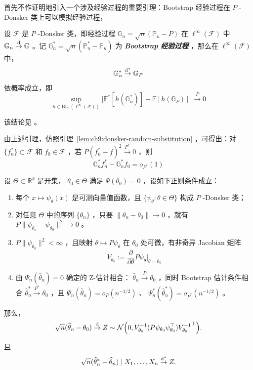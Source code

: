 首先不作证明地引入一个涉及经验过程的重要引理：Bootstrap 经验过程在 $P$ -Donsker 类上可以模拟经验过程，

\begin{lemma*}

设 $\mathscr F$ 是 $P$ -Donsker 类，即经验过程 $\mathbb G_n=\sqrt n(\mathbb P_n-P)$ 在 $\ell^\infty(\mathscr F)$ 中 $\mathbb G_n\overset{\rm d}\to \mathbb G$ 。记 $\mathbb G_n^*=\sqrt n(\mathbb P_n^*-\mathbb P_n)$ 为 \textbf{\emph{Bootstrap 经验过程}} ，那么在 $\ell^\infty(\mathscr F)$ 中， \[ \mathbb G_n^* \overset{\rm d^*}\to \mathbb G_P \]依概率成立，即
\[\sup_{h\in\mathrm{BL}_1(\ell^\infty(\mathscr F))}\Big|\mathbb E^*[h(\mathbb G_n^*)]-\mathbb E[h(\mathbb G_P)]\Big|\overset{P}\to 0\]
\end{lemma*}
该结论见 \cite{ginezinn1990}。

由上述引理，仿照引理~\ref{lem:ch9:donsker-random-substitution} ，可得出：对 $\{f^*_n\}\subset \mathscr F$ 和 $f_0\in \mathscr F$ ，若 $P(f^*_n-f)^2 \overset{P^*}\to 0$ ，则
\[\mathbb G_n^*f^*_n-\mathbb G_n^*f_0=o_{P^*}(1)\]

\begin{theorem}
\label{thm:ch11:bootstrap-z-estimator}

设 $\Theta\subset \mathbb R^k$ 是开集， $\theta_0\in\Theta$ 满足 $\Psi(\theta_0)=0$ ，设如下正则条件成立：

\begin{enumerate}
\def\labelenumi{\arabic{enumi}.}
\tightlist
\item
  每个 $x\mapsto \psi_\theta(x)$ 是可测向量值函数，且 $\{\psi_\theta:\theta\in\Theta\}$ 构成 $P$ -Donsker 类；
\item
  对任意 $\Theta$ 中的序列 $\{\theta_n\}$ ，只要 $\|\theta_n-\theta_0\|\to 0$ ，就有 $P\|\psi_{\theta_n}-\psi_{\theta_0}\|^2\to 0$ 。
\item
  $P\|\psi_{\theta_0}\|^2<\infty$ ，且映射 $\theta \mapsto P\psi_\theta$ 在 $\theta_0$ 处可微，有非奇异 Jacobian 矩阵\[ V_{\theta_0} := \frac{\partial}{\partial\theta} P\psi_\theta \Big|_{\theta=\theta_0} \]
\item
  由 $\Psi_n(\widehat\theta_n)=0$ 确定的 Z-估计相合： $\widehat\theta_n\overset{P}\to\theta_0$ ，同时 Bootstrap 估计条件相合 $\widehat\theta_n^* \overset{P^*}\to \theta_0$ ，且 $\Psi_n(\widehat\theta_n)=o_P(n^{-1/2})$ 、 $\Psi_n^*(\widehat \theta_n^*)=o_{P^*}(n^{-1/2})$ 。
\end{enumerate}

那么，
\[
\sqrt n(\widehat\theta_n-\theta_0)\overset{\rm d}\to Z\sim \mathcal N\Big(0,V_{\theta_0}^{-1}(P\psi_{\theta_0}\psi_{\theta_0}^\top){V_{\theta_0}^{-1}}^{\top}\Big).
\]

且
\[
\sqrt n(\widehat\theta_n^*-\widehat\theta_n)\mid X_1,\dots,X_n\overset{\rm d^*}\to Z.
\]

\end{theorem}

